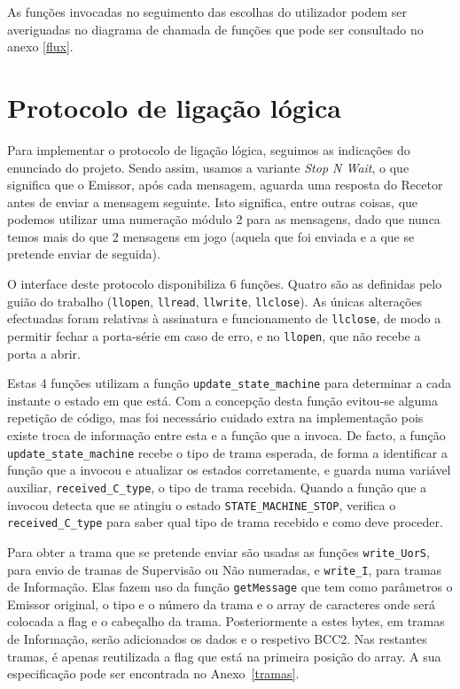 \documentclass[11pt,a4paper,reqno]{report}
\numberwithin{equation}{section}
\begin{document}
As funções invocadas no seguimento das escolhas do utilizador podem ser averiguadas no diagrama de chamada de funções que pode ser consultado no anexo \ref{flux}.

\chapter{Protocolo de ligação lógica}

Para implementar o protocolo de ligação lógica, seguimos as indicações do enunciado do projeto. Sendo assim, usamos a variante \emph{Stop N Wait}, o que significa que o Emissor, após cada mensagem, aguarda uma resposta do Recetor antes de enviar a mensagem seguinte. Isto significa, entre outras coisas, que podemos utilizar uma numeração módulo 2 para as mensagens, dado que nunca temos mais do que 2 mensagens em jogo (aquela que foi enviada e a que se pretende enviar de seguida).

O interface deste protocolo disponibiliza 6 funções. Quatro são as definidas pelo guião do trabalho (\verb|llopen|, \verb|llread|, \verb|llwrite|, \verb|llclose|). As únicas alterações efectuadas foram relativas à assinatura e funcionamento de \verb|llclose|, de modo a permitir fechar a porta-série em caso de erro, e no \verb|llopen|, que não recebe a porta a abrir. 

Estas 4 funções utilizam a função \verb|update_state_machine| para determinar a cada instante o estado em que está.
Com a concepção desta função evitou-se alguma repetição de código, mas foi necessário cuidado extra na implementação pois existe troca de informação entre esta e a função que a invoca. De facto, a função \verb|update_state_machine| recebe o tipo de trama esperada, de forma a identificar a função que a invocou e atualizar os estados corretamente, e guarda numa variável auxiliar, \verb|received_C_type|, o tipo de trama recebida. Quando a função que a invocou detecta que se atingiu o estado \verb|STATE_MACHINE_STOP|, verifica o \verb|received_C_type| para saber qual tipo de trama recebido e como deve proceder.

Para obter a trama que se pretende enviar são usadas as funções \verb|write_UorS|, para envio de tramas de Supervisão ou Não numeradas, e \verb|write_I|, para tramas de Informação. Elas fazem uso da função \verb|getMessage| que tem como parâmetros o Emissor original, o tipo e o número da trama e o array de caracteres onde será colocada a flag e o cabeçalho da trama. Posteriormente a estes bytes, em tramas de Informação, serão adicionados os dados e o respetivo BCC2. Nas restantes tramas, é apenas reutilizada a flag que está na primeira posição do array. A sua especificação pode ser encontrada no Anexo~\ref{tramas}.
\end{document}
